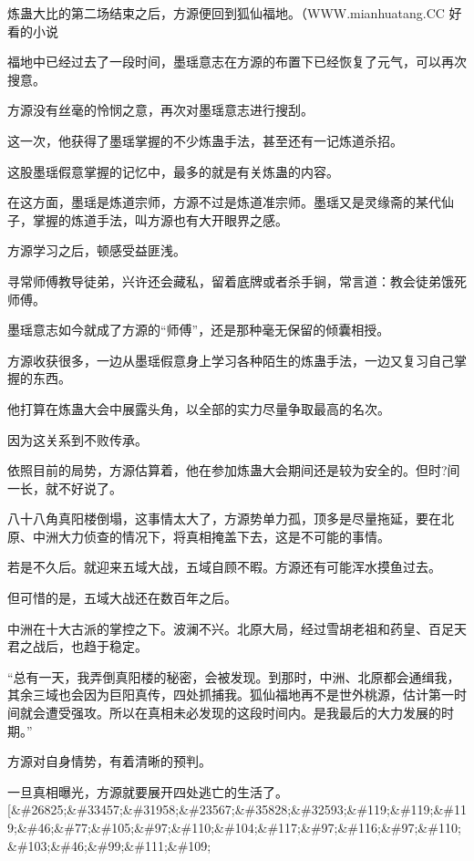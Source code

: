 
\begin{this_body}

炼蛊大比的第二场结束之后，方源便回到狐仙福地。（WWW.mianhuatang.CC 好看的小说

福地中已经过去了一段时间，墨瑶意志在方源的布置下已经恢复了元气，可以再次搜意。

方源没有丝毫的怜悯之意，再次对墨瑶意志进行搜刮。

这一次，他获得了墨瑶掌握的不少炼蛊手法，甚至还有一记炼道杀招。

这股墨瑶假意掌握的记忆中，最多的就是有关炼蛊的内容。

在这方面，墨瑶是炼道宗师，方源不过是炼道准宗师。墨瑶又是灵缘斋的某代仙子，掌握的炼道手法，叫方源也有大开眼界之感。

方源学习之后，顿感受益匪浅。

寻常师傅教导徒弟，兴许还会藏私，留着底牌或者杀手锏，常言道：教会徒弟饿死师傅。

墨瑶意志如今就成了方源的“师傅”，还是那种毫无保留的倾囊相授。

方源收获很多，一边从墨瑶假意身上学习各种陌生的炼蛊手法，一边又复习自己掌握的东西。

他打算在炼蛊大会中展露头角，以全部的实力尽量争取最高的名次。

因为这关系到不败传承。

依照目前的局势，方源估算着，他在参加炼蛊大会期间还是较为安全的。但时?间一长，就不好说了。

八十八角真阳楼倒塌，这事情太大了，方源势单力孤，顶多是尽量拖延，要在北原、中洲大力侦查的情况下，将真相掩盖下去，这是不可能的事情。

若是不久后。就迎来五域大战，五域自顾不暇。方源还有可能浑水摸鱼过去。

但可惜的是，五域大战还在数百年之后。

中洲在十大古派的掌控之下。波澜不兴。北原大局，经过雪胡老祖和药皇、百足天君之战后，也趋于稳定。

“总有一天，我弄倒真阳楼的秘密，会被发现。到那时，中洲、北原都会通缉我，其余三域也会因为巨阳真传，四处抓捕我。狐仙福地再不是世外桃源，估计第一时间就会遭受强攻。所以在真相未必发现的这段时间内。是我最后的大力发展的时期。”

方源对自身情势，有着清晰的预判。

一旦真相曝光，方源就要展开四处逃亡的生活了。[\&\#26825;\&\#33457;\&\#31958;\&\#23567;\&\#35828;\&\#32593;\&\#119;\&\#119;\&\#119;\&\#46;\&\#77;\&\#105;\&\#97;\&\#110;\&\#104;\&\#117;\&\#97;\&\#116;\&\#97;\&\#110;\&\#103;\&\#46;\&\#99;\&\#111;\&\#109;


\end{this_body}
